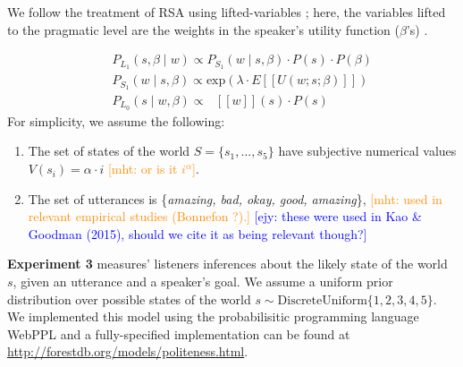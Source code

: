 \documentclass[10pt,letterpaper]{article}
\newcommand{\denote}[1]{\mbox{ $[\![ #1 ]\!]$}}
\newcommand{\mht}[1]{\textcolor{DarkOrange}{[mht: #1]}}
\newcommand{\ejy}[1]{\textcolor{Blue}{[ejy: #1]}}
\begin{document}
%
%
We follow the treatment of RSA using lifted-variables \cite{GoodmanLassiter2015, Kao2014, Degen2015}; here, the variables lifted to the pragmatic level are the weights in the speaker's utility function ($\beta$'s) .

%
\begin{eqnarray}
&&P_{L_1}(s, \beta \mid w)\propto P_{S_1}(w \mid s, \beta)\cdot P(s) \cdot P(\beta) \label{eq:L1}\\
&&P_{S_1}(w \mid s, \beta) \propto \mathrm{exp}(\lambda \cdot E[[U(w; s; \beta)]])\label{eq:S1}\\
&&P_{L_0}(s \mid w, \beta)\propto \denote{w}(s) \cdot P(s) \label{eq:L0}
\end{eqnarray}
%
For simplicity, we assume the following:
\begin{enumerate}
\item The set of states of the world $S = \{s_{1}, ...,  s_{5}\}$ have subjective numerical values $V(s_{i}) = \alpha \cdot i$ \mht{or is it $i^\alpha$}. 
\item The set of utterances is \{\emph{amazing, bad, okay, good, amazing}\},
  \mht{used in relevant empirical studies (Bonnefon ?).}
   \ejy{these were used in Kao \& Goodman (2015), should we cite it as being relevant though?}
\end{enumerate}

\textbf{Experiment 3} measures' listeners inferences about the likely state of the world $s$, given an utterance and a speaker's goal. 
We assume a uniform prior distribution over possible states of the world $s\sim \text{DiscreteUniform} \{1, 2, 3, 4, 5\}$. 
We implemented this model using the probabilisitic programming language WebPPL \cite{dippl} and a fully-specified implementation can be found at \url{http://forestdb.org/models/politeness.html}.

%
\end{document}
